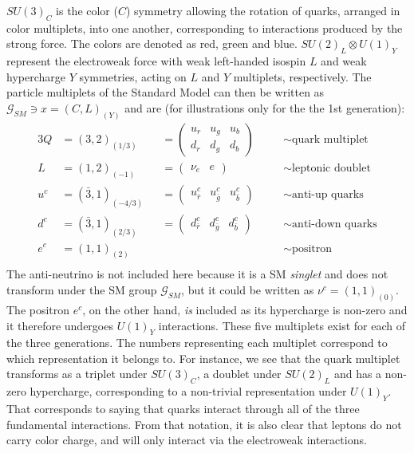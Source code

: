 $SU(3)_C$ is the color ($C$) symmetry allowing the rotation of quarks, arranged in color multiplets, into one another, corresponding to interactions produced by the strong force. The colors are denoted as red, green and blue. $SU (2)_L \otimes U(1)_Y$ represent the electroweak force with weak left-handed isospin $L$ and weak hypercharge $Y$ symmetries, acting on $L$ and $Y$ multiplets, respectively. %
The particle multiplets of the Standard Model can then be written as $\mathcal{G}_{SM} \ni x=(C,L)_{(Y)}$ and are (for illustrations only for the the 1st generation):
\begin{alignat}{3}
  \label{eq:theory:multiplets}
Q &= (3,2)_{(1/3)} &&=
  \begin{pmatrix} 
    u_r & u_g & u_b \\
    d_r & d_g & d_b
    \end{pmatrix} \quad  &&\sim \textrm{quark multiplet} \\[1pt]
L &= (1,2)_{(-1)} &&= \begin{pmatrix} \nu_e & e \end{pmatrix} \quad &&\sim \textrm{leptonic doublet} \\[1pt]
u^c &= (\bar{3},1)_{(-4/3)} &&= \begin{pmatrix} u_{\bar{r}}^c & u_{\bar{g}}^c & u_{\bar{b}}^c\end{pmatrix} \quad &&\sim \textrm{anti-up quarks} \\[1pt]
d^c &= (\bar{3},1)_{(2/3)}  &&= \begin{pmatrix} d_{\bar{r}}^c & d_{\bar{g}}^c & d_{\bar{b}}^c\end{pmatrix} \quad &&\sim \textrm{anti-down quarks} \\[1pt]
e^c &= (1,1)_{(2)}          && \quad &&\sim \textrm{positron} \\
\end{alignat}
The anti-neutrino is not included here because it is a SM \emph{singlet} and does not transform under the SM group $\mathcal{G}_{SM}$, but it could be written as $\nu^c=(1,1)_{(0)}$. The positron $e^c$, on the other hand, \emph{is} included as its hypercharge is non-zero and it therefore undergoes $U(1)_Y$ interactions. These five multiplets exist for each of the three generations.\newline
The numbers representing each multiplet correspond to which representation it belongs to. For instance, we see that the quark multiplet transforms as a triplet under $SU(3)_C$, a doublet under $SU(2)_L$ and has a non-zero hypercharge, corresponding to a non-trivial representation under $U(1)_Y$. That corresponds to saying that quarks interact through all of the three fundamental interactions. From that notation, it is also clear that leptons do not carry color charge, and will only interact via the electroweak interactions.\newline

